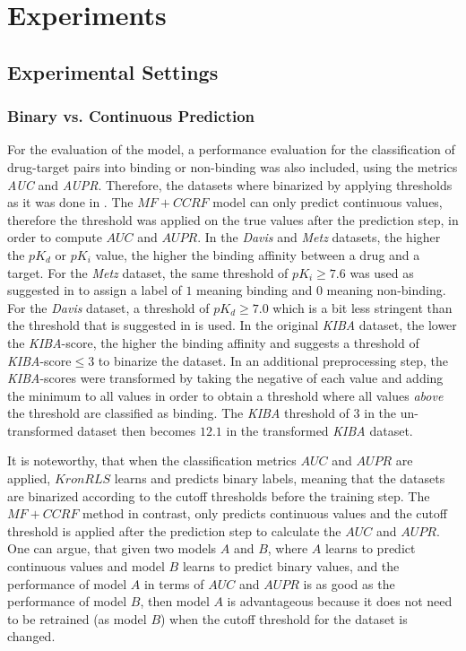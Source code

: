 \chapter{Experiments}



\section{Experimental Settings}

\subsection{Binary vs. Continuous Prediction}
\label{bincont}
For the evaluation of the model, a performance evaluation for the classification of drug-target pairs into binding or non-binding was also included, using the metrics \textit{AUC} and \textit{AUPR}. Therefore, the datasets where binarized by applying thresholds as it was done in \cite{pahikkala2014toward}. The $MF+CCRF$ model can only predict continuous values, therefore the threshold was applied on the true values after the prediction step, in order to compute $AUC$ and $AUPR$. In the \textit{Davis} and \textit{Metz} datasets, the higher the $pK_d$ or $pK_i$ value, the higher the binding affinity between a drug and a target. For the \textit{Metz} dataset, the same threshold of $pK_i\geq7.6$ was used as suggested in \cite{pahikkala2014toward} to assign a label of $1$ meaning binding and $0$ meaning non-binding. For the \textit{Davis} dataset, a threshold of $pK_d\geq7.0$ which is a bit less stringent than the threshold that is suggested in \cite{pahikkala2014toward} is used. In the original \textit{KIBA} dataset, the lower the \textit{KIBA}-score, the higher the binding affinity and \cite{tang2014making} suggests a threshold of \textit{KIBA}-score$\leq3$ to binarize the dataset. In an additional preprocessing step, the \textit{KIBA}-scores were transformed by taking the negative of each value and adding the minimum to all values in order to obtain a threshold where all values \textit{above} the threshold are classified as binding. The \textit{KIBA} threshold of $3$ in the un-transformed dataset then becomes $12.1$ in the transformed \textit{KIBA} dataset. 

It is noteworthy, that when the classification metrics $AUC$ and $AUPR$ are applied, $KronRLS$ learns and predicts binary labels, meaning that the datasets are binarized according to the cutoff thresholds before the training step. The $MF+CCRF$ method in contrast, only predicts continuous values and the cutoff threshold is applied after the prediction step to calculate the $AUC$ and $AUPR$. One can argue, that given two models $A$ and $B$, where $A$ learns to predict continuous values and model $B$ learns to predict binary values, and the performance of model $A$ in terms of $AUC$ and $AUPR$ is as good as the performance of model $B$, then model $A$ is advantageous because it does not need to be retrained (as model $B$) when the cutoff threshold for the dataset is changed.

